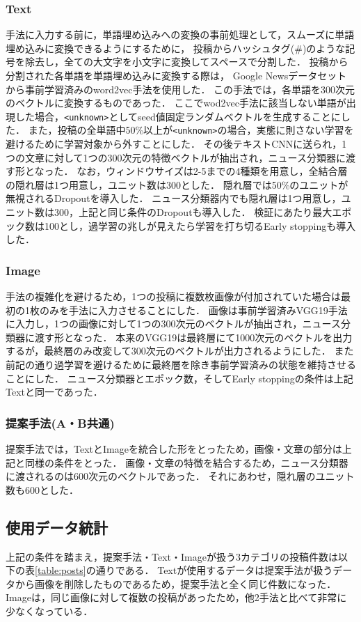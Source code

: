 \subsubsection{Text}
手法に入力する前に，単語埋め込みへの変換の事前処理として，スムーズに単語埋め込みに変換できるようにするために，
投稿からハッシュタグ(\#)のような記号を除去し，全ての大文字を小文字に変換してスペースで分割した．
投稿から分割された各単語を単語埋め込みに変換する際は，
Google Newsデータセットから事前学習済みのword2vec手法\cite{google_2013}を使用した．
この手法では，各単語を300次元のベクトルに変換するものであった．
ここでwod2vec手法に該当しない単語が出現した場合，\texttt{<unknown>}としてseed値固定ランダムベクトルを生成することにした．
また，投稿の全単語中50\%以上が\texttt{<unknown>}の場合，実態に則さない学習を避けるために学習対象から外すことにした．
その後テキストCNNに送られ，1つの文章に対して1つの300次元の特徴ベクトルが抽出され，ニュース分類器に渡す形となった．
なお，ウィンドウサイズは2-5までの4種類を用意し，全結合層の隠れ層は1つ用意し，ユニット数は300とした．
隠れ層では50\%のユニットが無視されるDropoutを導入した．
ニュース分類器内でも隠れ層は1つ用意し，ユニット数は300，上記と同じ条件のDropoutも導入した．
検証にあたり最大エポック数は100とし，過学習の兆しが見えたら学習を打ち切るEarly stoppingも導入した．
%
\subsubsection{Image}
手法の複雑化を避けるため，1つの投稿に複数枚画像が付加されていた場合は最初の1枚のみを手法に入力させることにした．
画像は事前学習済みVGG19手法に入力し，1つの画像に対して1つの300次元のベクトルが抽出され，ニュース分類器に渡す形となった．
本来のVGG19は最終層にて1000次元のベクトルを出力するが，最終層のみ改変して300次元のベクトルが出力されるようにした．
また前記の通り過学習を避けるために最終層を除き事前学習済みの状態を維持させることにした．
ニュース分類器とエポック数，そしてEarly stoppingの条件は上記Textと同一であった．
%
\subsubsection{提案手法(A・B共通)}
提案手法では，TextとImageを統合した形をとったため，画像・文章の部分は上記と同様の条件をとった．
画像・文章の特徴を結合するため，ニュース分類器に渡されるのは600次元のベクトルであった．
それにあわせ，隠れ層のユニット数も600とした．
%
\subsection{使用データ統計}
上記の条件を踏まえ，提案手法・Text・Imageが扱う3カテゴリの投稿件数は以下の表\ref{table:posts}の通りである．
Textが使用するデータは提案手法が扱うデータから画像を削除したものであるため，提案手法と全く同じ件数になった．
Imageは，同じ画像に対して複数の投稿があったため，他2手法と比べて非常に少なくなっている．

